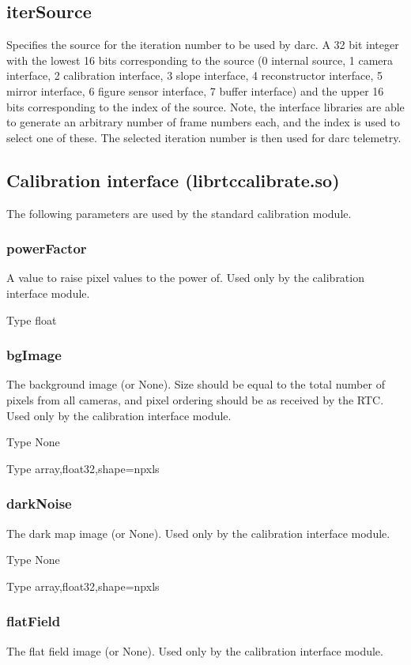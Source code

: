 \documentclass[a4,10pt]{article}
\begin{document}
\subsection{iterSource}
Specifies the source for the iteration number to be used by darc.
A 32 bit integer with the lowest 16 bits corresponding to the source
(0 internal source, 1 camera interface, 2 calibration interface, 3
slope interface, 4 reconstructor interface, 5 mirror interface, 6
figure sensor interface, 7 buffer interface) and the upper 16 bits
corresponding to the index of the source.  Note, the interface
libraries are able to generate an arbitrary number of frame numbers
each, and the index is used to select one of these.  The selected
iteration number is then used for darc telemetry. 


\subsection{Calibration interface (librtccalibrate.so)}
The following parameters are used by the standard calibration module.  
\subsubsection{powerFactor}
A value to raise pixel values to the power of.  Used only by the
calibration interface module.  

Type float

\subsubsection{bgImage}
The background image (or None).  Size should be equal to the total
number of pixels from all cameras, and pixel ordering should be as
received by the RTC.  Used only by the calibration interface module.

Type None

Type array,float32,shape=npxls

\subsubsection{darkNoise}
The dark map image (or None).  Used only by the calibration interface module.

Type None

Type array,float32,shape=npxls

\subsubsection{flatField}
The flat field image (or None).  Used only by the calibration interface module.
\end{document}
